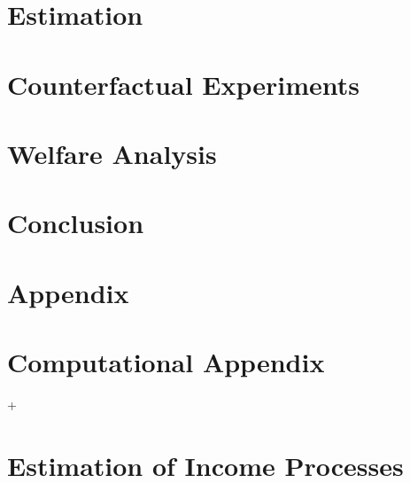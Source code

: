 \documentclass[12pt]{article}
\numberwithin{table}{section}
\begin{document}
\section{Estimation}
\section{Counterfactual Experiments}
\section{Welfare Analysis}
\section{Conclusion}




\appendix
{}
\section*{Appendix}
\section{Computational Appendix}
\cite{arnoud2019}+\cite{cartis2019}
\section{Estimation of Income Processes}
\end{document}
